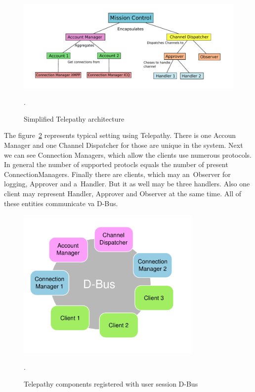 \begin{figure}[ht]
	\begin{center}
	\includegraphics[width=15cm]{fig/telepathy-architecture.pdf}
	\caption{Simplified Telepathy architecture}.
	\label{fig:telepathy-architecture}
\end{center}
\end{figure}

The figure~\ref{fig:telepathyComponentsDbus} represents typical setting using Telepathy. There is one Accoun Manager and one Channel Dispatcher for those are unique in the system. Next we can see Connection Managers, which allow the clients use numerous protocols. In general the number of supported protocls equals the number of present ConnectionManagers. Finally there are clients, which may an~Observer for logging, Approver and a~Handler. But it as well may be three handlers. Also one client may represent Handler, Approver and Observer at the same time. All of these entities communicate va D-Bus.  

\begin{figure}[ht]
	\begin{center}
	\includegraphics[width=9cm]{fig/telepathy-components-dbus.png}
	\caption{Telepathy components registered with user session D-Bus \cite{TPWiki}}.
	\label{fig:telepathyComponentsDbus}
\end{center}
\end{figure}


